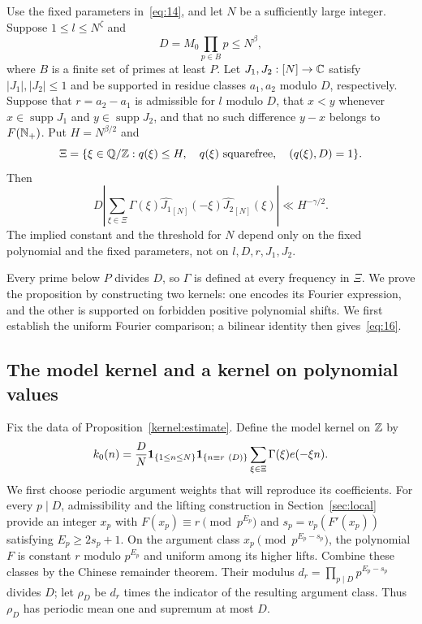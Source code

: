 \begin{proposition}
\label{kernel:estimate}
Use the fixed parameters in~\eqref{eq:14}, and let $N$ be a sufficiently
large integer. Suppose $1\le l\le N^\zeta$ and
\[
 D=M_0\prod_{p\in B}p\le N^\beta,
\]
where $B$ is a finite set of primes at least $P$. Let
$J_1,J_2:[N]\to\mathbb C$ satisfy $|J_1|,|J_2|\le1$ and be supported in
residue classes $a_1,a_2$ modulo $D$, respectively. Suppose that
$r=a_2-a_1$ is admissible for $l$ modulo $D$, that $x<y$ whenever
$x\in\operatorname{supp}J_1$ and $y\in\operatorname{supp}J_2$, and
that no such difference $y-x$ belongs to $F(\mathbb N_+)$.
Put $H=N^{\beta/2}$ and
\[
 \Xi=\{\xi\in\mathbb Q/\mathbb Z:q(\xi)\le H,\quad q(\xi)\text{ squarefree},
                         \quad(q(\xi),D)=1\}.
\]
Then
\begin{equation}
 D\left|\sum_{\xi\in\Xi}\Gamma(\xi)
          \widehat{J_1}_{[N]}(-\xi)\widehat{J_2}_{[N]}(\xi)\right|
 \ll H^{-\gamma/2}.
 \label{eq:16}
\end{equation}
The implied constant and the threshold for $N$ depend only on the fixed
polynomial and the fixed parameters, not on $l,D,r,J_1,J_2$.
\end{proposition}

Every prime below $P$ divides $D$, so $\Gamma$ is defined at every
frequency in $\Xi$. We prove the proposition by constructing two kernels:
one encodes its Fourier expression, and the other is supported on forbidden
positive polynomial shifts. We first establish the uniform Fourier
comparison; a bilinear identity then gives~\eqref{eq:16}.

\subsection{The model kernel and a kernel on polynomial values}

Fix the data of Proposition~\ref{kernel:estimate}. Define the model kernel
on $\mathbb Z$ by
\[
 k_0(n)=\frac DN\mathbf 1_{\{1\le n\le N\}}\mathbf 1_{\{n\equiv r\ (D)\}}
                   \sum_{\xi\in\Xi}\Gamma(\xi)e(-\xi n).
\]
We first choose periodic argument weights that will reproduce its
coefficients. For every $p\mid D$, admissibility and the lifting construction
in Section~\ref{sec:local} provide an integer $x_p$ with
$F(x_p)\equiv r\pmod{p^{E_p}}$ and
$s_p=v_p(F'(x_p))$ satisfying $E_p\ge2s_p+1$.
On the argument class $x_p\pmod{p^{E_p-s_p}}$, the polynomial $F$
is constant $r$ modulo $p^{E_p}$ and uniform among its higher lifts.
Combine these classes by the Chinese remainder theorem. Their modulus
$d_r=\prod_{p\mid D}p^{E_p-s_p}$ divides $D$; let $\rho_D$ be $d_r$
times the indicator of the resulting argument class. Thus $\rho_D$ has
periodic mean one and supremum at most $D$.

